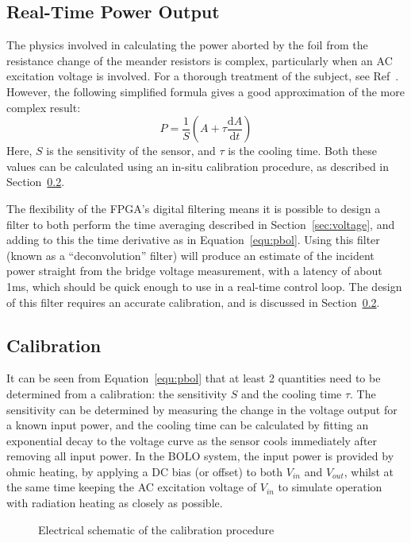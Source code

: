 \documentclass[12pt,a4paper]{article}
\begin{document}
\subsection{Real-Time Power Output}
\label{sec:rtpower}
The physics involved in calculating the power aborted by the foil from the resistance change of the meander resistors is complex, particularly when an AC
excitation voltage is involved. For a thorough treatment of the subject, see Ref~\cite{giannone-2002}. However, the following simplified formula gives a
good approximation of the more complex result:
\begin{equation}
  \label{equ:pbol}
  P = \frac{1}{S}\left(A + \tau \frac{\mathrm{d}A}{\mathrm{d}t}\right)
\end{equation}
Here, $S$ is the sensitivity of the sensor, and $\tau$ is the cooling time. Both these values can be calculated using an in-situ calibration procedure, as
described in Section~\ref{sec:calibration}.

The flexibility of the FPGA's digital filtering means it is possible to design a filter to both perform the time averaging described in
Section~\ref{sec:voltage}, and adding to this the time derivative as in Equation~\ref{equ:pbol}. Using this filter (known as a ``deconvolution'' filter)
will produce an estimate of the incident power straight from the bridge voltage measurement, with a latency of about 1ms, which should be quick enough to
use in a real-time control loop. The design of this filter requires an accurate calibration, and is discussed in Section~\ref{sec:calibration}.

\subsection{Calibration}
\label{sec:calibration}
It can be seen from Equation~\ref{equ:pbol} that at least 2 quantities need to be determined from a calibration: the sensitivity $S$ and the cooling
time $\tau$. The sensitivity can be determined by measuring the change in the voltage output for a known input power, and the cooling time can be
calculated by fitting an exponential decay to the voltage curve as the sensor cools immediately after removing all input power. In the BOLO system,
the input power is provided by ohmic heating, by applying a DC bias (or offset) to both $V_{in}$ and $V_{out}$, whilst at the same time keeping the
AC excitation voltage of $V_{in}$ to simulate operation with radiation heating as closely as possible.

\begin{figure}
  \centering
  \def\svgwidth{\columnwidth}
  
  \caption{Electrical schematic of the calibration procedure\label{fig:calibration}}
\end{figure}
\end{document}
